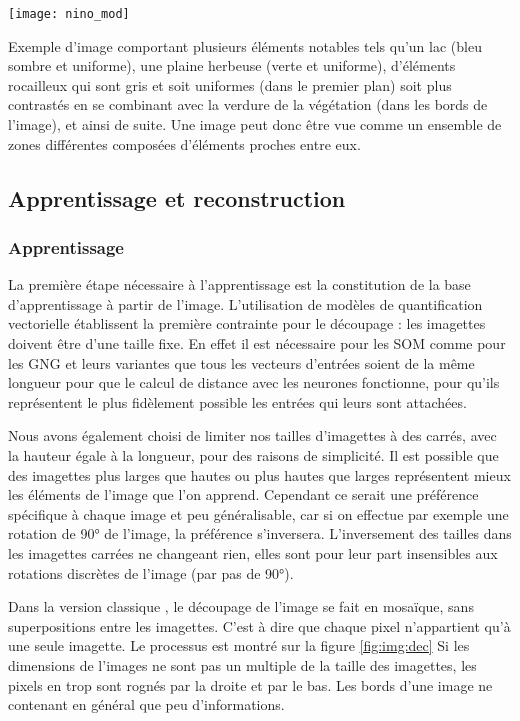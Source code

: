 	\begin{figureth}
		\texttt{[image: nino\_mod]}
		\caption[Lac de Nino]{Exemple d'image comportant plusieurs éléments notables tels qu'un lac (bleu sombre et uniforme), une plaine herbeuse (verte et uniforme), d'éléments rocailleux qui sont gris et soit uniformes (dans le premier plan) soit plus contrastés en se combinant avec la verdure de la végétation (dans les bords de l'image), et ainsi de suite. Une image peut donc être vue comme un ensemble de zones différentes composées d'éléments proches entre eux.\footnotemark}\label{fig:img:nino}
	\end{figureth}


	\subsection{Apprentissage et reconstruction}\label{sec:img:compression}
	\subsubsection{Apprentissage}
	La première étape nécessaire à l'apprentissage est la constitution de la base d'apprentissage à partir de l'image. L'utilisation de modèles de quantification vectorielle établissent la première contrainte pour le découpage : les imagettes doivent être d'une taille fixe. En effet il est nécessaire pour les SOM comme pour les GNG et leurs variantes que tous les vecteurs d'entrées soient de la même longueur pour que le calcul de distance avec les neurones fonctionne, pour qu'ils représentent le plus fidèlement possible les entrées qui leurs sont attachées.

	Nous avons également choisi de limiter nos tailles d'imagettes à des carrés, avec la hauteur égale à la longueur, pour des raisons de simplicité. Il est possible que des imagettes plus larges que hautes ou plus hautes que larges représentent mieux les éléments de l'image que l'on apprend. Cependant ce serait une préférence spécifique à chaque image et peu généralisable, car si on effectue par exemple une rotation de 90° de l'image, la préférence s'inversera. L'inversement des tailles dans les imagettes carrées ne changeant rien, elles sont pour leur part insensibles aux rotations discrètes de l'image (par pas de 90°).

	Dans la version classique \cite{amerijckx-compression}, le découpage de l'image se fait en mosaïque, sans superpositions entre les imagettes. C'est à dire que chaque pixel n'appartient qu'à une seule imagette. Le processus est montré sur la figure \ref{fig:img:dec} Si les dimensions de l'images ne sont pas un multiple de la taille des imagettes, les pixels en trop sont rognés par la droite et par le bas. Les bords d'une image ne contenant en général que peu d'informations.

